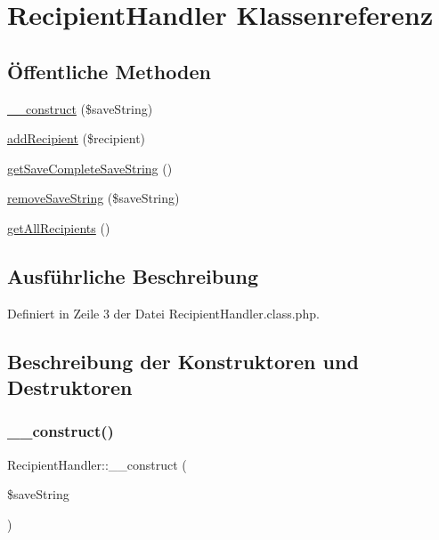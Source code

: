 \hypertarget{class_recipient_handler}{}\section{Recipient\+Handler Klassenreferenz}
\label{class_recipient_handler}
\subsection*{Öffentliche Methoden}
\begin{DoxyCompactItemize}
\item 
\mbox{\hyperlink{class_recipient_handler_a68ed7b47ea0cf4ee5ece3fa25960a819}{\+\_\+\+\_\+construct}} (\$save\+String)
\item 
\mbox{\hyperlink{class_recipient_handler_aa12bbece1bc22c4fa0337f793d9198ca}{add\+Recipient}} (\$recipient)
\item 
\mbox{\hyperlink{class_recipient_handler_ad4a308d96eb6a1d46fea7dfd2d01b886}{get\+Save\+Complete\+Save\+String}} ()
\item 
\mbox{\hyperlink{class_recipient_handler_a664b5c58ae2681228991ae107b198062}{remove\+Save\+String}} (\$save\+String)
\item 
\mbox{\hyperlink{class_recipient_handler_ad9b32fff134b74e35ab26f98cbaad68e}{get\+All\+Recipients}} ()
\end{DoxyCompactItemize}


\subsection{Ausführliche Beschreibung}


Definiert in Zeile 3 der Datei Recipient\+Handler.\+class.\+php.



\subsection{Beschreibung der Konstruktoren und Destruktoren}
\mbox{\label{class_recipient_handler_a68ed7b47ea0cf4ee5ece3fa25960a819}} 
\subsubsection{\texorpdfstring{\+\_\+\+\_\+construct()}{\_\_construct()}}
{\footnotesize\ttfamily Recipient\+Handler\+::\+\_\+\+\_\+construct (\begin{DoxyParamCaption}\item[{}]{\$save\+String }\end{DoxyParamCaption})}

